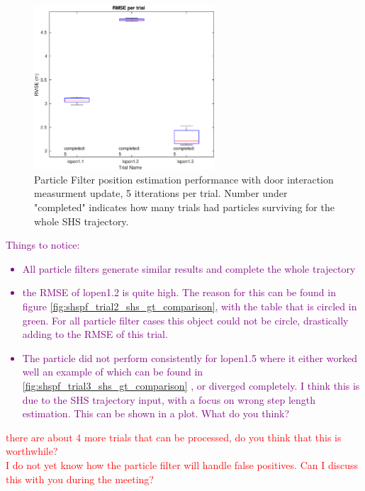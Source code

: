 \begin{figure}[H]
	\centering
	\includegraphics[width=0.6\textwidth]{images/20201103_1128_with_doors_2}
	\caption[Particle Filter position estimation performance with door interaction]{Particle Filter position estimation performance with door interaction measurment update, 5 itterations per trial. Number under "completed" indicates how many trials had particles surviving for the whole SHS trajectory. }
	
	\label{fig:pf_boxplot}
\end{figure}

\textcolor{purple}{
Things to notice:
\begin{itemize}
	\item All particle filters generate similar results and complete the whole trajectory
	\item the RMSE of lopen1.2 is quite high. The reason for this can be found in figure \cref{fig:shspf_trial2_shs_gt_comparison}, with the table that is circled in green. For all particle filter cases this object could not be circle, drastically adding to the RMSE of this trial.
	\item The particle did not perform consistently for lopen1.5 where it either worked well an example of which can be found in \cref{fig:shspf_trial3_shs_gt_comparison} , or diverged completely. I think this is due to the SHS trajectory input, with a focus on wrong step length estimation. This can be shown in a plot. What do you think?
\end{itemize}}

\textcolor{red}{there are about 4 more trials that can be processed, do you think that this is worthwhile?} \\
\textcolor{red}{I do not yet know how the particle filter will handle false positives. Can I discuss this with you during the meeting?}

